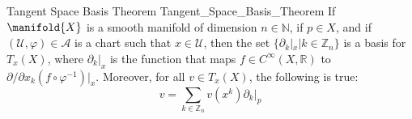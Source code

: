         \begin{ftheorem}{Tangent Space Basis Theorem}
                        {Tangent_Space_Basis_Theorem}
            If $\manifold{X}$ is a smooth manifold of dimension
            $n\in\mathbb{N}$, if $p\in{X}$, and if
            $(\mathcal{U},\varphi)\in\mathcal{A}$ is a chart such that
            $x\in\mathcal{U}$, then the set
            $\{\partial_{k}|_{x}|k\in\mathbb{Z}_{n}\}$ is a basis for
            $T_{x}(X)$, where $\partial_{k}|_{x}$ is the function that maps
            $f\in{C}^{\infty}(X,\mathbb{R})$ to
            $\partial/\partial{x}_{k}(f\circ\varphi^{\minus{1}})|_{x}$.
            Moreover, for all $v\in{T}_{x}(X)$, the following is true:
            \begin{equation}
                v=\sum_{k\in\mathbb{Z}_{n}}v(x^{k})\partial_{k}|_{p}
            \end{equation}
        \end{ftheorem}
